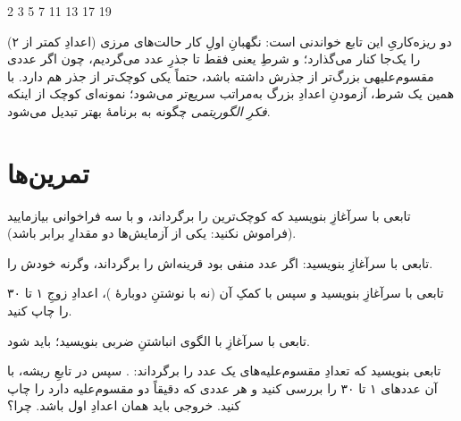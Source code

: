 \begin{progout}
2 3 5 7 11 13 17 19
\end{progout}

دو ریزه‌کاریِ این تابع خواندنی است: نگهبانِ اولِ کار حالت‌های مرزی (اعدادِ
کمتر از ۲) را یک‌جا کنار می‌گذارد؛ و شرطِ
 یعنی فقط تا جذرِ عدد می‌گردیم، چون
اگر عددی مقسوم‌علیهی بزرگ‌تر از جذرش داشته باشد، حتماً یکی کوچک‌تر از جذر
هم دارد. با همین یک شرط، آزمودنِ اعدادِ بزرگ به‌مراتب سریع‌تر می‌شود؛
نمونه‌ای کوچک از اینکه \emph{فکرِ الگوریتمی} چگونه به برنامهٔ بهتر تبدیل
می‌شود.

\section{تمرین‌ها}

\exercise تابعی با سرآغازِ  بنویسید که
کوچک‌ترین را برگرداند، و با سه فراخوانی بیازمایید (فراموش نکنید: یکی از
آزمایش‌ها دو مقدارِ برابر باشد).

\exercise تابعی با سرآغازِ  بنویسید: اگر عدد منفی
بود قرینه‌اش را برگرداند، وگرنه خودش را.

\exercise تابعی با سرآغازِ  بنویسید و سپس با کمکِ
آن (نه با نوشتنِ دوبارهٔ \code{\%})، اعدادِ زوجِ ۱ تا ۳۰ را چاپ کنید.

\exercise تابعی با سرآغازِ  با الگوی انباشتنِ
ضربی بنویسید؛  باید  شود.

\exercise تابعی بنویسید که تعدادِ مقسوم‌علیه‌های یک عدد را برگرداند:
. سپس در تابعِ ریشه، با آن عددهای ۱
تا ۳۰ را بررسی کنید و هر عددی که دقیقاً دو مقسوم‌علیه دارد را چاپ کنید.
خروجی باید همان اعدادِ اول باشد. چرا؟
